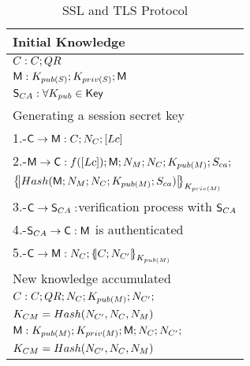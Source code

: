 \begin{table}[htb]
\footnotesize
\begin{center}
\caption{SSL and TLS Protocol}
\label{table:sslAndtlsProtocol}
\begin{tabular}{|l|}
\hline
  Initial Knowledge                                                                     \\\hline
            $C:C; QR$                                                                  \\ 
            $\textsf{M}: K_{pub(S)}; K_{priv(S)} ; \textsf{M}$                 \\ 
            $\textsf{S}_{CA}: \forall K_{pub}\in \textsf{Key}\;$                                   \\ \hline 
  Generating a session secret key                                                          \\
            1.-$\textsf{C}\rightarrow \textsf{M}:C; N_{C}; [Lc]$                         \\ 
            2.-$\textsf{M}\rightarrow \textsf{C}: f([Lc]); \textsf{M} ; N_{M}; N_{C}; 
                 K_{pub(M)}; S_{ca}; $                                            \\ 
            \hspace{3mm} $\fat{Hash(\Server\lnk N_{\serverW}\lnk N_{C}\lnk K_{pub(\serverW)}\lnk 
                        S_{ca})}_{K_{priv(\serverW)}}$                                          \\ 
            3.-$\textsf{C}\rightarrow \textsf{S}_{CA}:$verification process with $\textsf{S}_{CA}$             \\ 
            4.-$\textsf{S}_{CA} \rightarrow \textsf{C}: \textsf{M}$ is authenticated                     \\ 
            5.-$\Client\rightarrow \Server: N_{C}\lnk\fat{C\lnk N_{C'}}_{K_{pub(\serverW)}}$      \\ \hline
  New knowledge accumulated                                                               \\
            $C:C; QR ; N_{C}; K_{pub(M)}; N_{C'} ; $                                    \\
            \hspace{5mm} $K_{CM}=Hash(N_{C'},N_{C},N_{M})$                              \\ 
            $\textsf{M}: K_{pub(M)}; K_{priv(M)}; \textsf{M}; N_{C}; N_{C'};$    \\
            \hspace{5mm} $K_{CM}=Hash(N_{C'},N_{C},N_{M})$                               \\ \hline \hline 
\end{tabular}
\end{center}
\end{table}
\normalsize

